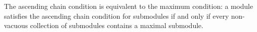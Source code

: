 The ascending chain condition is equivalent to the maximum condition: a module satisfies the ascending chain condition for submodules if and only if every non-vacuous collection of submodules contains a maximal submodule.
